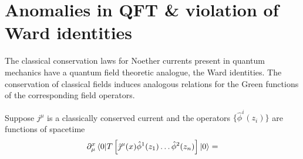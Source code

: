 \documentclass[11pt, a4paper]{article}
\theoremstyle{definition}
\theoremstyle{plain}
\begin{document}
\section{Anomalies in QFT \& violation of Ward identities}

The classical conservation laws for Noether currents present in quantum mechanics
have a quantum field theoretic analogue, the Ward identities. The conservation
of classical fields induces analogous relations for the Green functions of the 
corresponding field operators.

Suppose $j^\mu$ is a classically conserved current and the operators $\{\hat{\phi}^i(z_i)\}$
are functions of spacetime
\begin{equation}
\partial^x_{\mu}\braket{0|T\left[
\hat{\jmath}^\mu(x)\hat{\phi}^{1}(z_1)\dots\hat{\phi}^{2}(z_n) \right]|0} =
\end{equation}





\newpage


\end{document}
